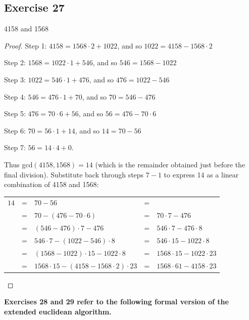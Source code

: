 \documentclass[14pt]{extarticle}
\newcommand{\cy}{\color{cyan}}
\begin{document}
\subsection{Exercise 27}
4158 and 1568

\begin{proof}
{\cy Step 1:} \(4158 = 1568 \cdot 2 + 1022\), and so \(1022 = 4158 - 1568 \cdot 2\)

{\cy Step 2:} \(1568 = 1022 \cdot 1 + 546\), and so \(546 = 1568 - 1022\)

{\cy Step 3:} \(1022 = 546 \cdot 1 + 476\), and so \(476 = 1022 - 546\)

{\cy Step 4:} \(546 = 476 \cdot 1 + 70\), and so \(70 = 546 - 476\)

{\cy Step 5:} \(476 = 70 \cdot 6 + 56\), and so \(56 = 476 - 70 \cdot 6\)

{\cy Step 6:} \(70 = 56 \cdot 1 + 14\), and so \(14 = 70 - 56\)

{\cy Step 7:} \(56 = 14 \cdot 4 + 0\).

Thus gcd\((4158, 1568) = 14\) (which is the remainder obtained just before the final division). Substitute back 
through steps $7-1$ to express 14 as a linear combination of 4158 and 1568:

\begin{tabular}{rclcl}
\(14\) & = & \(70 - 56\) & = & \(\) \\
\(\) & = & \(70 - (476 - 70 \cdot 6)\) & = & \(70 \cdot 7 - 476\) \\
\(\) & = & \((546 - 476) \cdot 7 - 476\) & = & \(546 \cdot 7 - 476 \cdot 8\) \\
\(\) & = & \(546 \cdot 7 - (1022 - 546) \cdot 8\) & = & \(546 \cdot 15 - 1022 \cdot 8\) \\
\(\) & = & \((1568 - 1022) \cdot 15 - 1022 \cdot 8\) & = & \(1568 \cdot 15 - 1022 \cdot 23\) \\
\(\) & = & \(1568 \cdot 15 - (4158 - 1568 \cdot 2) \cdot 23\) & = & \(1568 \cdot 61 - 4158 \cdot 23\)
\end{tabular}
\end{proof}

{\bf \cy Exercises 28 and 29 refer to the following formal version of the extended euclidean algorithm.}
\end{document}
